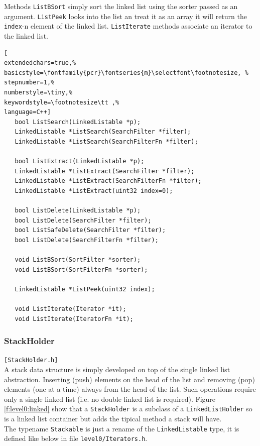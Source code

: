 Methods \texttt{ListBSort} simply sort the linked list using the sorter passed as an argument. \texttt{ListPeek} looks into the list an treat it as an array it will return the \texttt{index}-n element of the linked list. \texttt{ListIterate} methods associate an iterator to the linked list. \\


\begin{lstlisting}[
extendedchars=true,%
basicstyle=\fontfamily{pcr}\fontseries{m}\selectfont\footnotesize, %
stepnumber=1,%
numberstyle=\tiny,%
keywordstyle=\footnotesize\tt ,%
language=C++]
   bool ListSearch(LinkedListable *p);
   LinkedListable *ListSearch(SearchFilter *filter);
   LinkedListable *ListSearch(SearchFilterFn *filter);

   bool ListExtract(LinkedListable *p);
   LinkedListable *ListExtract(SearchFilter *filter);
   LinkedListable *ListExtract(SearchFilterFn *filter);
   LinkedListable *ListExtract(uint32 index=0);

   bool ListDelete(LinkedListable *p);
   bool ListDelete(SearchFilter *filter);
   bool ListSafeDelete(SearchFilter *filter);
   bool ListDelete(SearchFilterFn *filter);

   void ListBSort(SortFilter *sorter);
   void ListBSort(SortFilterFn *sorter);

   LinkedListable *ListPeek(uint32 index);

   void ListIterate(Iterator *it);
   void ListIterate(IteratorFn *it);
\end{lstlisting}



\subsubsection{StackHolder}
\texttt{[StackHolder.h]} \\
A stack data structure is simply developed on top of the single linked list abstraction. Inserting (push) elements on the head of the list and removing (pop) elements (one at a time) always from the head of the list. Such operations require only a single linked list (i.e. no double linked list is required). Figure \ref{f:level0:linked} show that a \texttt{StackHolder} is a subclass of a \texttt{LinkedListHolder} so is a linked list container but adds the tipical method a stack will have. \\


The typename \texttt{Stackable} is just a rename of the \texttt{LinkedListable} type, it is defined like below in file \texttt{level0/Iterators.h}.

